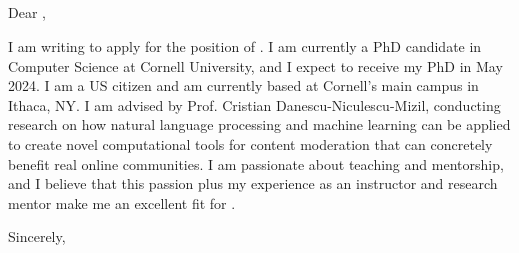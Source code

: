 \documentclass[12pt]{letter}
\begin{document}
\signature{Jonathan P. Chang}
\begin{letter}{
\chairname \\
\chairtitle \\
\department \\
\schoolnamelong \\
\schooladdress
}

\opening{Dear \chairlastname,}

I am writing to apply for the position of \position.
I am currently a PhD candidate in Computer Science at Cornell University, and I expect to receive my PhD in May 2024.
I am a US citizen and am currently based at Cornell's main campus in Ithaca, NY.
I am advised by Prof. Cristian Danescu-Niculescu-Mizil, conducting research on how natural language processing and machine learning can be applied to create novel computational tools for content moderation that can concretely benefit real online communities.
I am passionate about teaching and mentorship, and I believe that this passion plus my experience as an instructor and research mentor make me an excellent fit for \schoolname.


\closing{Sincerely,}

\end{letter}
\end{document}
